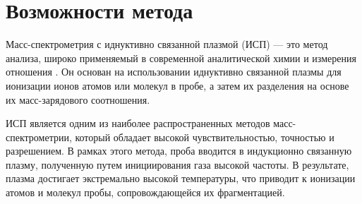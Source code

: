 \chapter{Возможности метода}

Масс-спектрометрия с иднуктивно связанной плазмой (ИСП) --- это метод анализа, широко применяемый в современной аналитической химии и измерения отношения \upb. Он основан на использовании иднуктивно связанной плазмы для ионизации ионов атомов или молекул в пробе, а затем их разделения на основе их масс-зарядового соотношения.

ИСП является одним из наиболее распространенных методов масс-спектрометрии, который    обладает высокой чувствительностью, точностью и разрешением. В рамках этого метода, проба вводится в индукционно связанную плазму, полученную путем инициирования газа высокой частоты. В результате, плазма достигает экстремально высокой температуры, что приводит к ионизации атомов и молекул пробы, сопровождающейся их фрагментацией.
